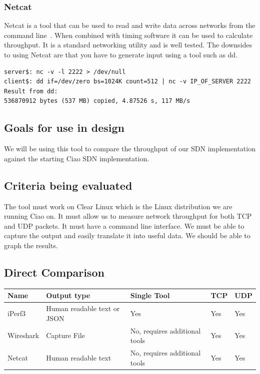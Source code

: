 \documentclass[10pt,letterpaper,onecolumn,journal]{IEEEtran}
\begin{document}
\subsubsection{Netcat}
Netcat is a tool that can be used to read and write data across networks from the command line~\cite{netcat}.
When combined with timing software it can be used to calculate throughput.
It is a standard networking utility and is well tested.
The downsides to using Netcat are that you have to generate input using a tool such as dd.
\begin{lstlisting}[caption = Caclulating throughput with netcat and dd~\cite{nc-example}, basicstyle=\ttfamily]
server$: nc -v -l 2222 > /dev/null
client$: dd if=/dev/zero bs=1024K count=512 | nc -v IP_OF_SERVER 2222
Result from dd:
536870912 bytes (537 MB) copied, 4.87526 s, 117 MB/s
\end{lstlisting}

\subsection{Goals for use in design}
We will be using this tool to compare the throughput of our SDN implementation against the starting Ciao SDN implementation.

\subsection{Criteria being evaluated}
The tool must work on Clear Linux which is the Linux distribution we are running Ciao on.
It must allow us to measure network throughput for both TCP and UDP packets. 
It must have a command line interface.
We must be able to capture the output and easily translate it into useful data. 
We should be able to graph the results. 

\subsection{Direct Comparison}

\begin{center}
	\begin{tabular}{| l | l | l | l | l |}
		\hline
		Name & Output type & Single Tool & TCP & UDP \\ \hline
		iPerf3 & Human readable text or JSON & Yes & Yes & Yes \\ \hline
		Wireshark & Capture File & No, requires additional tools & Yes & Yes \\ \hline
                Netcat & Human readable text & No, requires additional tools & Yes & Yes \\ \hline
	\end{tabular}
\end{center}
\end{document}
